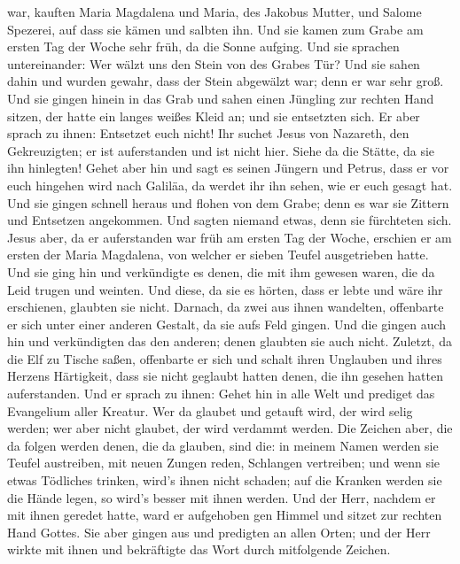 war, kauften Maria Magdalena und Maria, des Jakobus Mutter, und Salome
Spezerei, auf dass sie kämen und salbten ihn.  Und sie kamen
zum Grabe am ersten Tag der Woche sehr früh, da die Sonne aufging.
 Und sie sprachen untereinander: Wer wälzt uns den Stein von
des Grabes Tür?  Und sie sahen dahin und wurden gewahr, dass
der Stein abgewälzt war; denn er war sehr groß.  Und sie
gingen hinein in das Grab und sahen einen Jüngling zur rechten Hand
sitzen, der hatte ein langes weißes Kleid an; und sie entsetzten sich.
 Er aber sprach zu ihnen: Entsetzet euch nicht! Ihr suchet
Jesus von Nazareth, den Gekreuzigten; er ist auferstanden und ist nicht
hier. Siehe da die Stätte, da sie ihn hinlegten!  Gehet aber
hin und sagt es seinen Jüngern und Petrus, dass er vor euch hingehen
wird nach Galiläa, da werdet ihr ihn sehen, wie er euch gesagt hat.
 Und sie gingen schnell heraus und flohen von dem Grabe;
denn es war sie Zittern und Entsetzen angekommen. Und sagten niemand
etwas, denn sie fürchteten sich.  Jesus aber, da er
auferstanden war früh am ersten Tag der Woche, erschien er am ersten der
Maria Magdalena, von welcher er sieben Teufel ausgetrieben hatte.
 Und sie ging hin und verkündigte es denen, die mit ihm
gewesen waren, die da Leid trugen und weinten.  Und diese,
da sie es hörten, dass er lebte und wäre ihr erschienen, glaubten sie
nicht.  Darnach, da zwei aus ihnen wandelten, offenbarte er
sich unter einer anderen Gestalt, da sie aufs Feld gingen. 
Und die gingen auch hin und verkündigten das den anderen; denen glaubten
sie auch nicht.  Zuletzt, da die Elf zu Tische saßen,
offenbarte er sich und schalt ihren Unglauben und ihres Herzens
Härtigkeit, dass sie nicht geglaubt hatten denen, die ihn gesehen hatten
auferstanden.  Und er sprach zu ihnen: Gehet hin in alle
Welt und prediget das Evangelium aller Kreatur.  Wer da
glaubet und getauft wird, der wird selig werden; wer aber nicht glaubet,
der wird verdammt werden.  Die Zeichen aber, die da folgen
werden denen, die da glauben, sind die: in meinem Namen werden sie
Teufel austreiben, mit neuen Zungen reden,  Schlangen
vertreiben; und wenn sie etwas Tödliches trinken, wird's ihnen nicht
schaden; auf die Kranken werden sie die Hände legen, so wird's besser
mit ihnen werden.  Und der Herr, nachdem er mit ihnen
geredet hatte, ward er aufgehoben gen Himmel und sitzet zur rechten Hand
Gottes.  Sie aber gingen aus und predigten an allen Orten;
und der Herr wirkte mit ihnen und bekräftigte das Wort durch mitfolgende
Zeichen.
